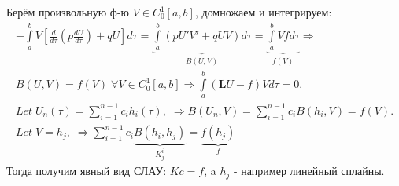 \documentclass[__main__.tex]{subfiles}
\begin{document}
	Берём произвольную ф-ю $V\in C^1_0[a,b]$, домножаем и интегрируем:
	\begin{gather*}
-\int\limits_a^b V\left[\frac{d}{d\tau}\left(p\frac{dU}{d\tau}\right)+qU\right]d\tau=
\underbrace{\int\limits_a^b\left(pU\prime V\prime+qUV\right)d\tau}_{B(U,V)}
	=\underbrace{\int\limits_a^b Vfd\tau}_{f(V)}\Rightarrow\\
	B(U,V)=f(V)\;\forall V\in C^1_0[a,b]\Rightarrow
	\int\limits_a^b\left(\mathbf{L}U-f\right)Vd\tau=0.\\
	Let\;U_n(\tau)=\sum\limits_{i=1}^{n-1}c_i h_i(\tau),\;\Rightarrow
	B(U_n,V)=\sum\limits_{i=1}^{n-1}c_i B(h_i,V)=f(V).\\
	Let\;V=h_j,\;\Rightarrow\sum\limits_{i=1}^{n-1}c_i \underbrace{B(h_i,h_j)}_{K^i_j}=\underbrace{f(h_j)}_{f}
	\end{gather*}
	Тогда получим явный вид СЛАУ: $Kc=f$, a $h_j$ - например линейный сплайны.
\end{document}
